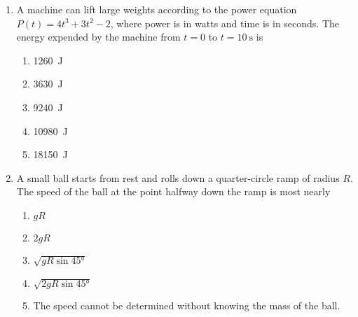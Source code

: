 \documentclass{../../../oss-apphys}
\begin{document}
\begin{multicols}{2}
\begin{enumerate}[resume,leftmargin=18pt]
  \item A machine can lift large weights according to the power equation
    $P(t)=4t^3+3t^2-2$, where power is in watts and time is in seconds. The
    energy expended by the machine from $t=0$ to $t=\SI{10}{\second}$ is
    \begin{enumerate}[nosep,leftmargin=18pt,label=(\Alph*)]
    \item\SI{1260}{\joule}
    \item\SI{3630}{\joule}
    \item\SI{9240}{\joule}
    \item\SI{10980}{\joule}
    \item\SI{18150}{\joule}
    \end{enumerate}

  \item A small ball starts from rest and rolls down a quarter-circle ramp of
    radius $R$. The speed of the ball at the point halfway down the ramp is
    most nearly
    \begin{center}
    \end{center}
    \begin{enumerate}[nosep,leftmargin=18pt,label=(\Alph*)]
    \item $gR$
    \item $2gR$
    \item $\displaystyle\sqrt{gR\sin\ang{45}}$
    \item $\displaystyle\sqrt{2gR\sin\ang{45}}$
    \item The speed cannot be determined without knowing the mass of the ball.
    \end{enumerate}
  \end{enumerate}
\end{multicols}
\newpage


\genfreedirections
\end{document}

